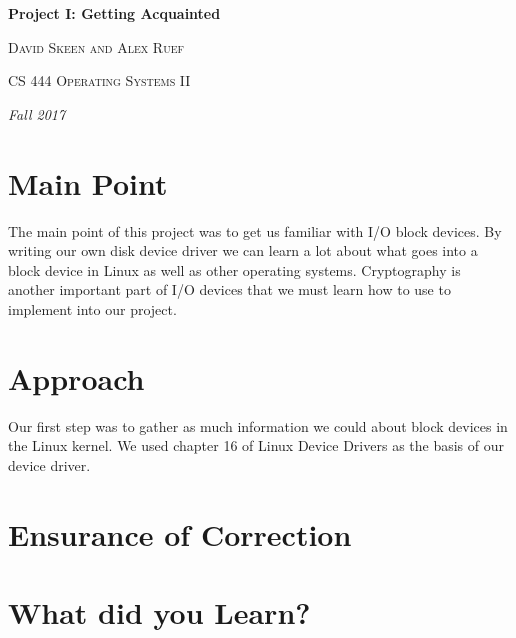 \documentclass[10pt,drafclsnofoot,onecolumn]{article}
\begin{document}
               
\begin{titlepage}
\centering
{\huge\bfseries Project I: Getting Acquainted\par}
\vspace{.5cm}
{\scshape David Skeen and Alex Ruef \par}
\vspace{.5cm}   
{\scshape CS 444 Operating Systems II\par}
\vspace{.5cm} 
{\Large\itshape Fall 2017\par}
\par
\par
\begin{abstract}

\end{abstract}
\end{titlepage}

\section{Main Point}
The main point of this project was to get us familiar with I/O block devices.
By writing our own disk device driver we can learn a lot about what goes into a block device in Linux as well as other operating systems.
Cryptography is another important part of I/O devices that we must learn how to use to implement into our project.

\section{Approach}
Our first step was to gather as much information we could about block devices in the Linux kernel.
We used chapter 16 of Linux Device Drivers as the basis of our device driver.

\section{Ensurance of Correction}


\section{What did you Learn?}
\end{document}
